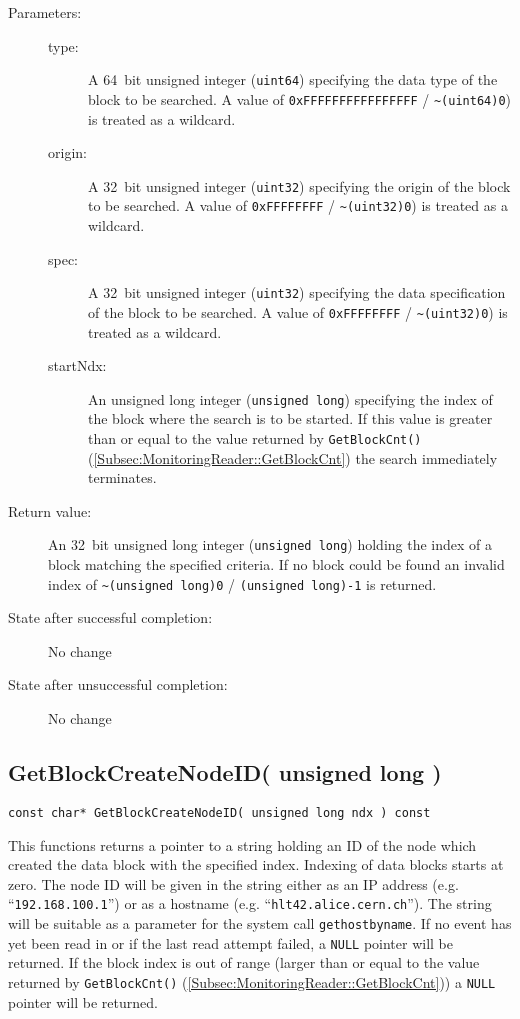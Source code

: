 \documentclass[a4paper,twoside]{article}
\begin{document}
\begin{description}
\item[Parameters:]
	\begin{description}
		\item[type:] A 64~bit unsigned integer (\texttt{uint64}) specifying the data type of the block to be searched. A value of
		\texttt{0xFF\-FF\-FF\-FF\-FF\-FF\-FF\-FF} / \texttt{\~{ }(uint64)0}) is treated as a wildcard.
		\item[origin:] A 32~bit unsigned integer (\texttt{uint32}) specifying the origin of the block to be searched. A value of
		\texttt{0xFF\-FF\-FF\-FF} / \texttt{\~{ }(uint32)0}) is treated as a wildcard.
		\item[spec:] A 32~bit unsigned integer (\texttt{uint32}) specifying the data specification of the block to be searched. A value of
		\texttt{0xFF\-FF\-FF\-FF} / \texttt{\~{ }(uint32)0}) is treated as a wildcard.
		\item[startNdx:] An unsigned long integer (\texttt{unsigned long}) specifying the index of the block where the search is to be started.
		If this value is greater than or equal to the value returned by \texttt{GetBlockCnt()} (\ref{Subsec:MonitoringReader::GetBlockCnt}) the 
		search immediately terminates.
	\end{description}
\item[Return value:] An 32~bit unsigned long integer (\texttt{unsigned long}) holding the index of a block matching the specified criteria. If no block could be found 
an invalid index of \texttt{\~{ }(unsigned long)0} / \texttt{(unsigned long)-1} is returned.
\item[State after successful completion:] No change
\item[State after unsuccessful completion:] No change
\end{description}


\subsection{GetBlockCreateNodeID( unsigned long )}

\texttt{const char* GetBlockCreateNodeID( unsigned long ndx ) const}

This functions returns a pointer to a string holding an ID of the node which created the data block with the specified index. 
Indexing of data blocks starts at zero. The node ID will be given in the string either as an IP address (e.g. ``\texttt{192.168.100.1}'')
or as a hostname (e.g. ``\texttt{hlt42.alice.cern.ch}''). The string will be suitable as a parameter for the system call \texttt{gethostbyname}.
If no event has yet been read in or if the last read attempt failed, a \texttt{NULL} pointer will be returned.
If the block index is out of range (larger than or equal to the value returned by \texttt{GetBlockCnt()} (\ref{Subsec:MonitoringReader::GetBlockCnt}))
a \texttt{NULL} pointer will be returned.
\end{document}
